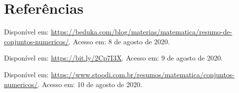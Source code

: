 \documentclass[10pt]{article}
\begin{document}
\vfill
\section*{Referências}
\noindent Disponível em: \url{https://beduka.com/blog/materias/matematica/resumo-de-conjuntos-numericos/}. Acesso em: 8 de agosto de 2020.

\noindent Disponível em: 
\url{https://bit.ly/2Cp7I3X}. Acesso em: 9 de agosto de 2020.

\noindent Disponível em: 
\url{https://www.stoodi.com.br/resumos/matematica/conjuntos-numericos/}. Acesso em: 10 de agosto de 2020.
\end{document}
